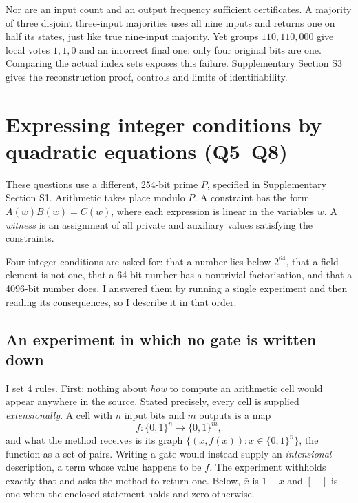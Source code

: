 \documentclass[11pt,a4paper]{article}
\begin{document}
Nor are an input count and an output frequency sufficient certificates.
A majority of three disjoint three-input majorities uses all nine inputs
and returns one on half its states, just like true nine-input majority.
Yet groups $110,110,000$ give local votes $1,1,0$ and an incorrect final
one: only four original bits are one. Comparing the actual index sets
exposes this failure. Supplementary Section S3 gives the reconstruction
proof, controls and limits of identifiability.
\FloatBarrier

\section{Expressing integer conditions by quadratic equations (Q5--Q8)}
These questions use a different, 254-bit prime $P$, specified in
Supplementary Section S1. Arithmetic takes place modulo $P$. A constraint
has the form $A(w)B(w)=C(w)$, where each expression is linear in the
variables $w$. A \emph{witness} is an assignment of all private and auxiliary
values satisfying the constraints.

Four integer conditions are asked for: that a number lies below $2^{64}$, that
a field element is not one, that a 64-bit number has a nontrivial
factorisation, and that a 4096-bit number does. I answered them by running a
single experiment and then reading its consequences, so I describe it in that
order.

\subsection{An experiment in which no gate is written down}
\label{sec:experiment}
I set 4 rules. First: nothing about \emph{how} to compute an arithmetic cell
would appear anywhere in the source. Stated precisely, every cell is supplied
\emph{extensionally}. A cell with $n$ input bits and $m$ outputs is a map
\begin{equation}\label{eq:cellmap}
f:\{0,1\}^n\to\{0,1\}^m,
\end{equation} 
and what the method receives is its graph $\{(x,f(x)):x\in\{0,1\}^n\}$, the
function as a set of pairs. Writing a gate would instead supply an
\emph{intensional} description, a term whose value happens to be $f$. The
experiment withholds exactly that and asks the method to return one. Below,
$\bar x$ is $1-x$ and $[\,\cdot\,]$ is one when the enclosed statement holds and
zero otherwise.
\end{document}
